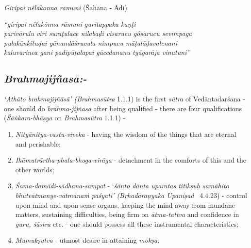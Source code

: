 \textit{Giripai nêlakonna rāmuni} (Śahāna - Ādi)

\begin{longquote}
\textit{“giripai nêlakônna rāmuni guritappaka kaṇṭi} \\ \textit{parivārulu viri suraṭulace nilabaḍi visarucu gôsarucu sevimpaga}\\ \textit{pulakānkituḍai yānandāśruvula nimpucu māṭalāḍavalenani}\\ \textit{kaluvarinca gani padipūṭalapai gācedananu tyāgarāja vinutuni”}
\end{longquote}

\subsection*{\textit{Brahmajijñasā:-}}

\vspace{-.2cm}


\textit{‘Athāto brahmajijñāsā' (Brahmasūtra} 1.1.1) is the first \textit{sūtra} of Vedānta\-darśana - one should do \textit{brahma-jijñāsā} after being qualified - there are four qualifications (\textit{Śāṅkara-bhāṣya} on \textit{Brahmasūtra} 1.1.1) -

\vspace{-.3cm}

\begin{enumerate}
\itemsep=0pt

 \item \textit{Nityānitya-vastu-viveka} - having the wisdom of the things that are eternal and perishable;

 \item \textit{Ihāmutrārtha-phala-bhoga-virāga} - detachment in the comforts of this and the other worlds;

 \item \textit{Śama-damādi-sādhana-sampat} - ‘\textit{śānto dānta uparatas titikṣuḥ samā\-hito bhūtvātmanye-vātmānaṁ paśyati’ (Bṛhadāraṇyaka Upaniṣad}  4.4.23) - control upon mind and upon sense organs, keeping the mind away from mundane matters, sustaining difficulties, being firm on \textit{ātma-tattva} and confidence in \textit{guru, śāstra} etc. - one should possess all these instrumental characteristics;

 \item \textit{Mumukṣutva} - utmost desire in attaining \textit{mokṣa.}

\end{enumerate}

